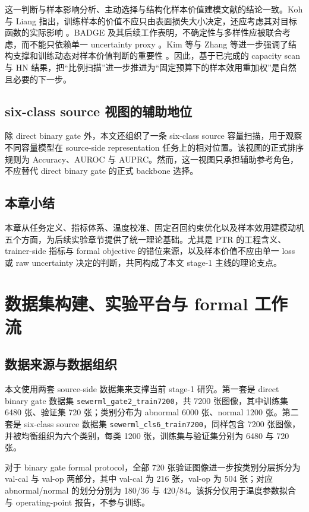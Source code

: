 \documentclass[UTF8,openany,12pt]{ctexbook}
\begin{document}
这一判断与样本影响分析、主动选择与结构化样本价值建模文献的结论一致。Koh 与 Liang 指出，训练样本的价值不应只由表面损失大小决定，还应考虑其对目标函数的实际影响 \cite{koh2017influence}。BADGE 及其后续工作表明，不确定性与多样性应被联合考虑，而不能只依赖单一 uncertainty proxy \cite{ash2020badge,wu2022entropy,yang2024plug}。Kim 等与 Zhang 等进一步强调了结构支撑和训练动态对样本价值判断的重要性 \cite{kim2024structural,zhang2024tdds}。因此，基于已完成的 capacity scan 与 HN 结果，把“比例扫描”进一步推进为“固定预算下的样本效用重加权”是自然且必要的下一步。

\section{six-class source 视图的辅助地位}
除 direct binary gate 外，本文还组织了一条 six-class source 容量扫描，用于观察不同容量模型在 source-side representation 任务上的相对位置。该视图的正式排序规则为 Accuracy、AUROC 与 AUPRC。然而，这一视图只承担辅助参考角色，不应替代 direct binary gate 的正式 backbone 选择。

\section{本章小结}
本章从任务定义、指标体系、温度校准、固定召回约束优化以及样本效用建模动机五个方面，为后续实验章节提供了统一理论基础。尤其是 PTR 的工程含义、trainer-side 指标与 formal objective 的错位来源，以及样本价值不应由单一 loss 或 raw uncertainty 决定的判断，共同构成了本文 stage-1 主线的理论支点。

\chapter{数据集构建、实验平台与 formal 工作流}

\section{数据来源与数据组织}
本文使用两套 source-side 数据集来支撑当前 stage-1 研究。第一套是 direct binary gate 数据集 \texttt{sewerml\_gate2\_train7200}，共 7200 张图像，其中训练集 6480 张、验证集 720 张；类别分布为 abnormal 6000 张、normal 1200 张。第二套是 six-class source 数据集 \texttt{sewerml\_cls6\_train7200}，同样包含 7200 张图像，并被均衡组织为六个类别，每类 1200 张，训练集与验证集分别为 6480 与 720 张。

对于 binary gate formal protocol，全部 720 张验证图像进一步按类别分层拆分为 val-cal 与 val-op 两部分，其中 val-cal 为 216 张，val-op 为 504 张；对应 abnormal/normal 的划分分别为 180/36 与 420/84。该拆分仅用于温度参数拟合与 operating-point 报告，不参与训练。
\end{document}
